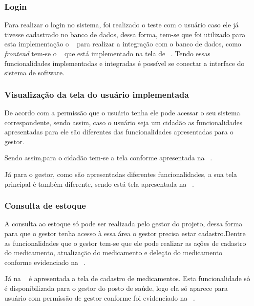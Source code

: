 \subsubsection{Login}

Para realizar o login no sistema, foi realizado o teste com o usuário caso ele já tivesse cadastrado no banco de dados, dessa forma, tem-se que foi utilizado para esta implementação o ~ para realizar a integração com o banco de dados, como \emph{frontend} tem-se o ~ que está implementado na tela de ~. Tendo essas funcionalidades implementadas e integradas é possível se conectar a interface do sistema de software.


\subsubsection{Visualização da tela do usuário implementada}

De acordo com a permissão que o usuário tenha ele pode acessar o seu sistema correspondente, sendo assim, caso o usuário seja um cidadão as funcionalidades apresentadas para ele são diferentes das funcionalidades apresentadas para o gestor.


%

Sendo assim,para o cidadão tem-se a tela conforme apresentada na ~.


%

Já para o gestor, como são apresentadas diferentes funcionalidades, a sua tela principal é também diferente, sendo está tela apresentada na ~.


\subsubsection{Consulta de estoque}

A consulta ao estoque só pode ser realizada pelo gestor do projeto, dessa forma para que o gestor tenha acesso à essa área o gestor precisa estar cadastro.Dentre as funcionalidades que o gestor  tem-se que ele pode realizar as ações de cadastro do medicamento, atualização do medicamento e deleção do medicamento conforme evidenciado na ~. 

%

%

Já na ~ é apresentada a tela de cadastro de medicamentos. Esta funcionalidade só é disponibilizada para o gestor do posto de saúde, logo ela só aparece para usuário com permissão de gestor conforme foi evidenciado na ~.
